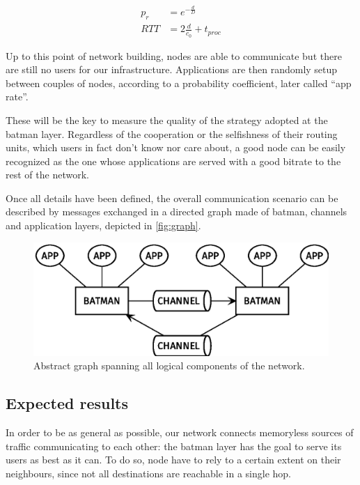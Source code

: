 \documentclass[conference]{IEEEtran}
\begin{document}
\begin{equation}
  \begin{split}
    p_r & = e^{-\frac{d}{D}} \\
    RTT &= 2 \frac{d}{c_0} + t_{proc}
  \end{split}
\end{equation}

Up to this point of network building, nodes are able to communicate but there are still no users for our infrastructure.
Applications are then randomly setup between couples of nodes, according to a probability coefficient, later called ``app rate''.

These will be the key to measure the quality of the strategy adopted at the \gls{batman} layer.
Regardless of the cooperation or the selfishness of their routing units, which users in fact don't know nor care about, a good node can be easily recognized as the one whose applications are served with a good bitrate to the rest of the network.

\smallskip
Once all details have been defined, the overall communication scenario can be described by messages exchanged in a directed graph made of \gls{batman}, channels and application layers, depicted in \autoref{fig:graph}.

\begin{figure}[h]
  \centering
  \includegraphics[width=\linewidth]{figures/layers_diagram}
  \caption{Abstract graph spanning all logical components of the network.}
  \label{fig:graph}
\end{figure}

\subsection{Expected results}

In order to be as general as possible, our network connects memoryless sources of traffic communicating to each other: the \gls{batman} layer has the goal to serve its users as best as it can. To do so, node have to rely to a certain extent on their neighbours, since not all destinations are reachable in a single hop.
\end{document}
